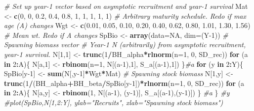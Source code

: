 \documentclass[
]{krantz}
\makeatletter
\newenvironment{Shaded}{\begin{snugshade}}{\end{snugshade}}
\newcommand{\AttributeTok}[1]{\textcolor[rgb]{0.27,0.27,0.27}{#1}}
\newcommand{\CommentTok}[1]{\textcolor[rgb]{0.37,0.37,0.37}{\textit{#1}}}
\newcommand{\ConstantTok}[1]{\textcolor[rgb]{0.37,0.37,0.37}{#1}}
\newcommand{\ControlFlowTok}[1]{\textcolor[rgb]{0.27,0.27,0.27}{\textbf{#1}}}
\newcommand{\DecValTok}[1]{\textcolor[rgb]{0.06,0.06,0.06}{#1}}
\newcommand{\FloatTok}[1]{\textcolor[rgb]{0.06,0.06,0.06}{#1}}
\newcommand{\FunctionTok}[1]{\textcolor[rgb]{0.27,0.27,0.27}{\textbf{#1}}}
\newcommand{\NormalTok}[1]{#1}
\newcommand{\OtherTok}[1]{\textcolor[rgb]{0.37,0.37,0.37}{#1}}
\newcommand{\SpecialCharTok}[1]{\textcolor[rgb]{0.43,0.43,0.43}{\textbf{#1}}}
\newenvironment{kframe}{%
\medskip{}
\setlength{\fboxsep}{.8em}
 \def\at@end@of@kframe{}%
 \ifinner\ifhmode%
  \def\at@end@of@kframe{\end{minipage}}%
  \begin{minipage}{\columnwidth}%
 \fi\fi%
 \def\FrameCommand##1{\hskip\@totalleftmargin \hskip-\fboxsep
 \colorbox{shadecolor}{##1}\hskip-\fboxsep
     \hskip-\linewidth \hskip-\@totalleftmargin \hskip\columnwidth}%
 \MakeFramed {\advance\hsize-\width
   \@totalleftmargin\z@ \linewidth\hsize
   \@setminipage}}%
 {\par\unskip\endMakeFramed%
 \at@end@of@kframe}
\renewenvironment{Shaded}{\begin{kframe}}{\end{kframe}}
\makeatother
\begin{document}
\begin{Shaded}
\begin{Highlighting}[]
\CommentTok{\# Set up year{-}1 vector based on asymptotic recruitment and year{-}1 survival}
\NormalTok{Mat }\OtherTok{\textless{}{-}} \FunctionTok{c}\NormalTok{(}\DecValTok{0}\NormalTok{, }\DecValTok{0}\NormalTok{, }\FloatTok{0.2}\NormalTok{, }\FloatTok{0.4}\NormalTok{, }\FloatTok{0.8}\NormalTok{, }\DecValTok{1}\NormalTok{, }\DecValTok{1}\NormalTok{, }\DecValTok{1}\NormalTok{, }\DecValTok{1}\NormalTok{, }\DecValTok{1}\NormalTok{) }
\CommentTok{\# Arbitrary maturity schedule. Redo if max age (A) changes}
\NormalTok{Wgt }\OtherTok{\textless{}{-}} \FunctionTok{c}\NormalTok{(}\FloatTok{0.01}\NormalTok{, }\FloatTok{0.05}\NormalTok{, }\FloatTok{0.10}\NormalTok{, }\FloatTok{0.20}\NormalTok{, }\FloatTok{0.40}\NormalTok{, }\FloatTok{0.62}\NormalTok{, }\FloatTok{0.80}\NormalTok{, }\FloatTok{1.01}\NormalTok{, }\FloatTok{1.30}\NormalTok{, }\FloatTok{1.56}\NormalTok{) }
\CommentTok{\# Mean wt. Redo if A changes}
\NormalTok{SpBio }\OtherTok{\textless{}{-}} \FunctionTok{array}\NormalTok{(}\AttributeTok{data=}\ConstantTok{NA}\NormalTok{, }\AttributeTok{dim=}\NormalTok{(Y}\DecValTok{{-}1}\NormalTok{)) }\CommentTok{\# Spawning biomass vector}
\CommentTok{\# Year{-}1 N (arbitrarily) from asymptotic recruitment, year{-}1 survival.}
\NormalTok{N[}\DecValTok{1}\NormalTok{,}\DecValTok{1}\NormalTok{] }\OtherTok{\textless{}{-}} \FunctionTok{trunc}\NormalTok{(}\DecValTok{1}\SpecialCharTok{/}\NormalTok{BH\_alpha}\SpecialCharTok{*}\FunctionTok{rlnorm}\NormalTok{(}\AttributeTok{n=}\DecValTok{1}\NormalTok{, }\DecValTok{0}\NormalTok{, SD\_rec))}
\ControlFlowTok{for}\NormalTok{ (a }\ControlFlowTok{in} \DecValTok{2}\SpecialCharTok{:}\NormalTok{A)\{}
\NormalTok{  N[a,}\DecValTok{1}\NormalTok{] }\OtherTok{\textless{}{-}} \FunctionTok{rbinom}\NormalTok{(}\AttributeTok{n=}\DecValTok{1}\NormalTok{, N[(a}\DecValTok{{-}1}\NormalTok{),}\DecValTok{1}\NormalTok{], S\_a[(a}\DecValTok{{-}1}\NormalTok{),}\DecValTok{1}\NormalTok{])}
\NormalTok{\}}\CommentTok{\#a}
\ControlFlowTok{for}\NormalTok{ (y }\ControlFlowTok{in} \DecValTok{2}\SpecialCharTok{:}\NormalTok{Y)\{}
\NormalTok{  SpBio[y}\DecValTok{{-}1}\NormalTok{] }\OtherTok{\textless{}{-}} \FunctionTok{sum}\NormalTok{(N[,y}\DecValTok{{-}1}\NormalTok{]}\SpecialCharTok{*}\NormalTok{Wgt}\SpecialCharTok{*}\NormalTok{Mat) }\CommentTok{\# Spawning stock biomass}
\NormalTok{  N[}\DecValTok{1}\NormalTok{,y] }\OtherTok{\textless{}{-}} \FunctionTok{trunc}\NormalTok{(}\DecValTok{1}\SpecialCharTok{/}\NormalTok{(BH\_alpha}\SpecialCharTok{+}\NormalTok{BH\_beta}\SpecialCharTok{/}\NormalTok{SpBio[y}\DecValTok{{-}1}\NormalTok{])}\SpecialCharTok{*}\FunctionTok{rlnorm}\NormalTok{(}\AttributeTok{n=}\DecValTok{1}\NormalTok{, }\DecValTok{0}\NormalTok{, SD\_rec))}
  \ControlFlowTok{for}\NormalTok{ (a }\ControlFlowTok{in} \DecValTok{2}\SpecialCharTok{:}\NormalTok{A)\{}
\NormalTok{    N[a,y] }\OtherTok{\textless{}{-}} \FunctionTok{rbinom}\NormalTok{(}\DecValTok{1}\NormalTok{, N[(a}\DecValTok{{-}1}\NormalTok{), (y}\DecValTok{{-}1}\NormalTok{)], S\_a[(a}\DecValTok{{-}1}\NormalTok{),(y}\DecValTok{{-}1}\NormalTok{)])}
\NormalTok{  \} }\CommentTok{\#a}
\NormalTok{\} }\CommentTok{\#y}
\CommentTok{\#plot(SpBio,N[1,2:Y], ylab="Recruits", xlab="Spawning stock biomass")}


\end{Highlighting}
\end{Shaded}
\end{document}
